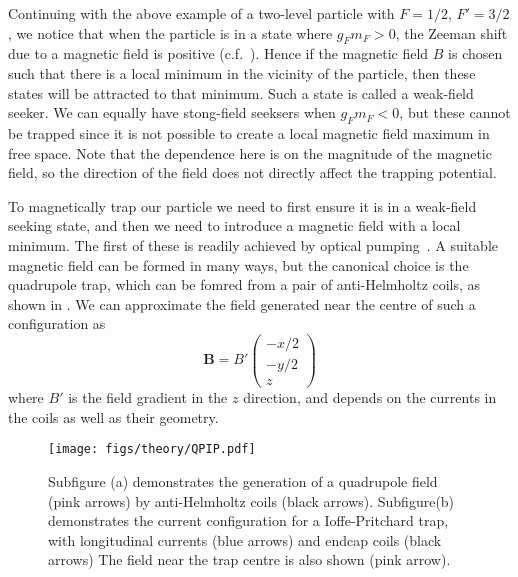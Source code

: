 Continuing with the above example of a two-level particle with $F=1/2$,
$F'=3/2$, we notice that when the particle is in a state where $g_F m_F > 0$,
the Zeeman shift due to a magnetic field is positive (c.f.\
). Hence if the magnetic field $B$ is chosen such
that there is a local minimum in the vicinity of the particle, then these
states will be attracted to that minimum. Such a state is called a weak-field
seeker. We can equally have stong-field seeksers when $g_F m_F < 0$, but these
cannot be trapped since it is not possible to create a local magnetic field
maximum in free space.
%
Note that the dependence here is on the magnitude of the magnetic field, so the
direction of the field does not directly affect the trapping potential.

To magnetically trap our particle we need to first ensure it is in a weak-field
seeking state, and then we need to introduce a magnetic field with a local
minimum. The first of these is readily achieved by optical
pumping~\cite{PhysRevLett.54.2596}.  A suitable magnetic field can be formed in
many ways, but the canonical choice is the quadrupole trap, which can be fomred
from a pair of anti-Helmholtz coils, as shown in
. We can approximate the field generated near
the centre of such a configuration as~\cite{Metcalf1999}
%
\begin{equation}
  \mathbf{B} = B'\begin{pmatrix} -x/2 \\ -y/2 \\ z \end{pmatrix}
  \label{theory:eqn:quadrupole}
\end{equation}
%
where $B'$ is the field gradient in the $z$ direction, and depends on the
currents in the coils as well as their geometry.

\begin{figure}
  \centering
  \texttt{[image: figs/theory/QPIP.pdf]}
  \caption[Quadrupole and Ioffe-Pritchard traps]{
    Subfigure (a) demonstrates the generation of a quadrupole field
    (pink arrows) by
  anti-Helmholtz coils (black arrows). Subfigure(b) demonstrates the current
  configuration for a
  Ioffe-Pritchard trap, with longitudinal currents (blue arrows) and endcap
coils (black arrows) The field near the trap centre is also shown (pink arrow).
}
  \label{theory:fig:fields}
\end{figure}

